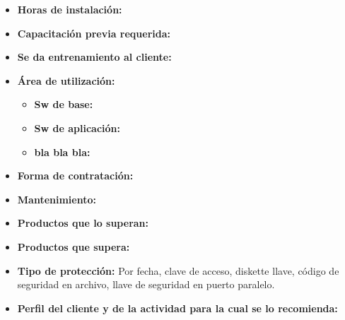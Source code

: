 \begin{itemize}
    \item \textbf{Horas de instalación:}
    \item \textbf{Capacitación previa requerida:}
    \item \textbf{Se da entrenamiento al cliente:}

    \item \textbf{Área de utilización:}
      \begin{itemize}
        \item \textbf{Sw de base:}
        \item \textbf{Sw de aplicación:}
        \item \textbf{bla bla bla:}
      \end{itemize}

    \item \textbf{Forma de contratación:}
    \item \textbf{Mantenimiento:}
    \item \textbf{Productos que lo superan:}
    \item \textbf{Productos que supera:}
    \item \textbf{Tipo de protección:} Por fecha, clave de acceso, diskette llave, código de seguridad en archivo, llave de     seguridad en puerto paralelo.
    \item \textbf{Perfil del cliente y de la actividad para la cual se lo recomienda:}
\end{itemize}

